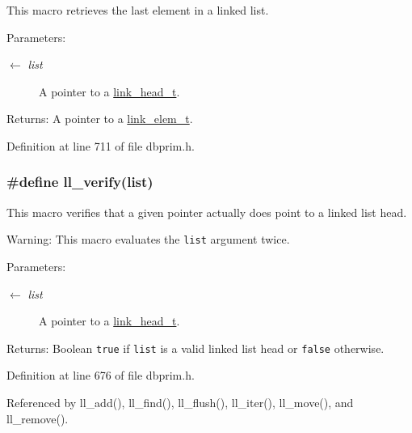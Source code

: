 This macro retrieves the last element in a linked list.

\begin{Desc}
\item[Parameters:]
\begin{description}
\item[\mbox{$\leftarrow$} {\em list}]A pointer to a \hyperlink{group__dbprim__link_ga0}{link\_\-head\_\-t}.\end{description}
\end{Desc}
\begin{Desc}
\item[Returns:]A pointer to a \hyperlink{group__dbprim__link_ga1}{link\_\-elem\_\-t}.\end{Desc}


Definition at line 711 of file dbprim.h.\hypertarget{group__dbprim__link_ga15}{
\subsubsection[ll\_\-verify]{\setlength{\rightskip}{0pt plus 5cm}\#define ll\_\-verify(list)}}
\label{group__dbprim__link_ga15}


This macro verifies that a given pointer actually does point to a linked list head.

\begin{Desc}
\item[Warning:]This macro evaluates the {\tt list} argument twice.\end{Desc}
\begin{Desc}
\item[Parameters:]
\begin{description}
\item[\mbox{$\leftarrow$} {\em list}]A pointer to a \hyperlink{group__dbprim__link_ga0}{link\_\-head\_\-t}.\end{description}
\end{Desc}
\begin{Desc}
\item[Returns:]Boolean {\tt true} if {\tt list} is a valid linked list head or {\tt false} otherwise.\end{Desc}


Definition at line 676 of file dbprim.h.

Referenced by ll\_\-add(), ll\_\-find(), ll\_\-flush(), ll\_\-iter(), ll\_\-move(), and ll\_\-remove().

